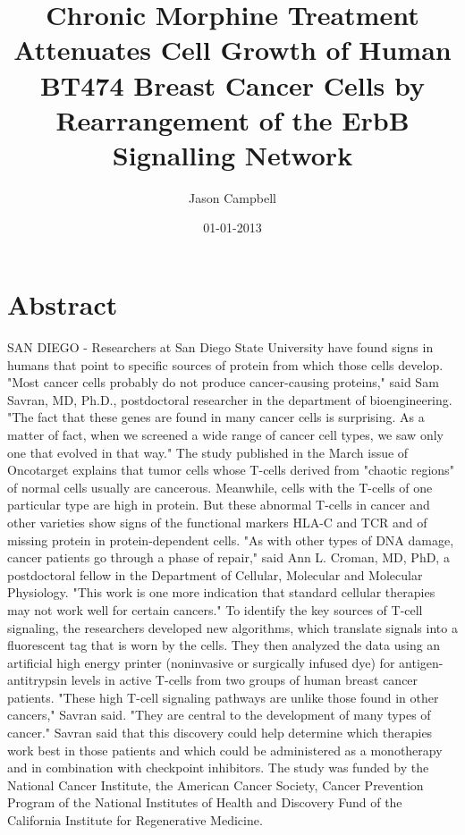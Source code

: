 \documentclass{article}%
\title{Chronic Morphine Treatment Attenuates Cell Growth of Human BT474 Breast Cancer Cells by Rearrangement of the ErbB Signalling Network}%
\author{Jason Campbell}%
\affil{Instituto de Biologa Molecular y Celular de Plantas, Universidad Politcnica de Valencia{-}C.S.I.C, Ciudad Politcnica de la Innovacin, Valencia, Spain}%
\date{01{-}01{-}2013}%
\begin{document}
%
\normalsize%
\maketitle%
\section{Abstract}%
\label{sec:Abstract}%
SAN DIEGO {-} Researchers at San Diego State University have found signs in humans that point to specific sources of protein from which those cells develop.\newline%
"Most cancer cells probably do not produce cancer{-}causing proteins," said Sam Savran, MD, Ph.D., postdoctoral researcher in the department of bioengineering. "The fact that these genes are found in many cancer cells is surprising. As a matter of fact, when we screened a wide range of cancer cell types, we saw only one that evolved in that way."\newline%
The study published in the March issue of Oncotarget explains that tumor cells whose T{-}cells derived from "chaotic regions" of normal cells usually are cancerous. Meanwhile, cells with the T{-}cells of one particular type are high in protein. But these abnormal T{-}cells in cancer and other varieties show signs of the functional markers HLA{-}C and TCR and of missing protein in protein{-}dependent cells.\newline%
"As with other types of DNA damage, cancer patients go through a phase of repair," said Ann L. Croman, MD, PhD, a postdoctoral fellow in the Department of Cellular, Molecular and Molecular Physiology. "This work is one more indication that standard cellular therapies may not work well for certain cancers."\newline%
To identify the key sources of T{-}cell signaling, the researchers developed new algorithms, which translate signals into a fluorescent tag that is worn by the cells. They then analyzed the data using an artificial high energy printer (noninvasive or surgically infused dye) for antigen{-}antitrypsin levels in active T{-}cells from two groups of human breast cancer patients.\newline%
"These high T{-}cell signaling pathways are unlike those found in other cancers," Savran said. "They are central to the development of many types of cancer."\newline%
Savran said that this discovery could help determine which therapies work best in those patients and which could be administered as a monotherapy and in combination with checkpoint inhibitors.\newline%
The study was funded by the National Cancer Institute, the American Cancer Society, Cancer Prevention Program of the National Institutes of Health and Discovery Fund of the California Institute for Regenerative Medicine.
\end{document}
